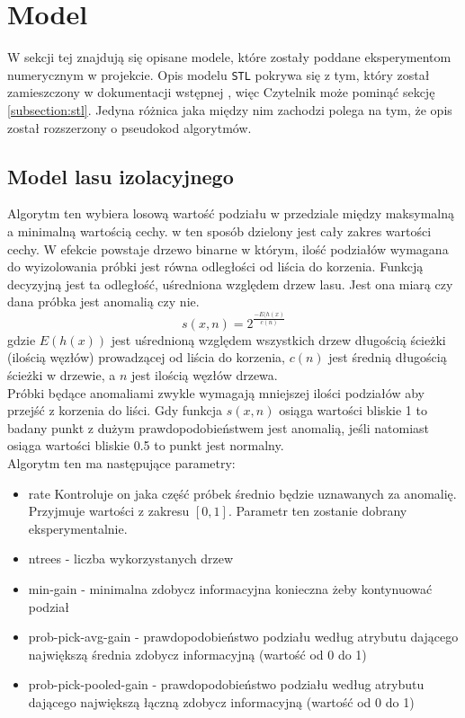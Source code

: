 \section{Model}
\label{section:modele}

W sekcji tej znajdują się opisane modele, które zostały poddane eksperymentom numerycznym w projekcie. 
Opis modelu \texttt{STL} pokrywa się z tym, który został zamieszczony w dokumentacji wstępnej \cite{Dzienisz}, więc Czytelnik może pominąć sekcję \ref{subsection:stl}.
Jedyna różnica jaka między nim zachodzi polega na tym, że opis został rozszerzony o pseudokod algorytmów.

\subsection{Model lasu izolacyjnego}
\label{subsection:iforest}

Algorytm ten wybiera losową wartość podziału w przedziale między maksymalną a minimalną wartością cechy. w ten sposób dzielony jest cały zakres wartości cechy. W efekcie powstaje drzewo binarne w którym, ilość podziałów wymagana do wyizolowania próbki jest równa odległości od liścia do korzenia. Funkcją decyzyjną jest ta odległość, uśredniona względem drzew lasu. Jest ona miarą czy dana próbka jest anomalią czy nie.
  \[s(x, n) = 2^{\frac{-E(h(x)}{c(n)}}\]
  gdzie $E(h(x))$ jest uśrednioną względem wszystkich drzew długością ścieżki (ilością węzłów) prowadzącej od liścia do korzenia, $c(n)$ jest średnią długością ścieżki w drzewie, a $n$ jest ilością węzłów drzewa. \\
  Próbki będące anomaliami zwykle wymagają mniejszej ilości podziałów aby przejść z korzenia do liści. Gdy funkcja $s(x, n)$ osiąga wartości bliskie 1 to badany punkt z dużym prawdopodobieństwem jest anomalią, jeśli natomiast osiąga wartości bliskie 0.5 to punkt jest normalny.  \\
  
  Algorytm ten ma następujące parametry:
  \begin{itemize}
      \item rate Kontroluje on jaka część próbek średnio będzie uznawanych za anomalię. Przyjmuje wartości z zakresu $[0,1]$. Parametr ten zostanie dobrany eksperymentalnie. 
      \item ntrees - liczba wykorzystanych drzew 
      \item min-gain - minimalna zdobycz informacyjna konieczna żeby kontynuować podział
      \item prob-pick-avg-gain - prawdopodobieństwo podziału według atrybutu dającego największą średnia zdobycz informacyjną (wartość od 0 do 1)
      \item prob-pick-pooled-gain - prawdopodobieństwo podziału według atrybutu dającego największą łączną zdobycz informacyjną (wartość od 0 do 1) %
  \end{itemize}


